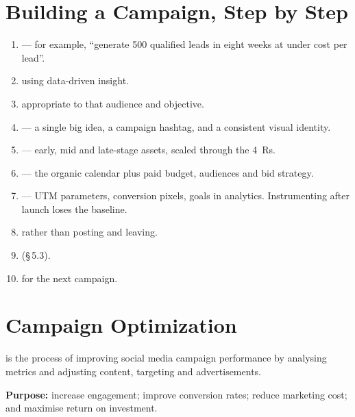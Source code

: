 \documentclass{MMTextbook}
\begin{document}
\section{Building a Campaign, Step by Step}

\begin{enumerate}
\item {} --- for example, ``generate 500 qualified
      leads in eight weeks at under  cost per lead''.
\item {} using data-driven insight.
\item {} appropriate to that audience and objective.
\item {} --- a single big idea, a campaign
      hashtag, and a consistent visual identity.
\item {} --- early, mid and
      late-stage assets, scaled through the 4~Rs.
\item {} --- the organic calendar plus paid budget,
      audiences and bid strategy.
\item {} --- UTM parameters, conversion pixels,
      goals in analytics. Instrumenting after launch loses the baseline.
\item {} rather than posting and leaving.
\item {} (\S\,5.3).
\item {} for the next campaign.
\end{enumerate}

\section{Campaign Optimization}

\begin{exambox}
 is the process of
improving social media campaign performance by analysing metrics and adjusting
content, targeting and advertisements.

\smallskip
\textbf{Purpose:} increase engagement; improve conversion rates; reduce
marketing cost; and maximise return on investment.
\end{exambox}
\end{document}
